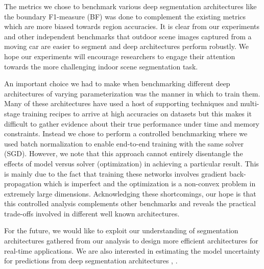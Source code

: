 \documentclass[10pt,journal,compsoc]{IEEEtran}
\begin{document}
 The metrics we chose to benchmark various deep segmentation architectures like the boundary F1-measure (BF) was done to complement the existing metrics which are more biased towards region accuracies. It is clear from our experiments and other independent benchmarks \cite{cordts2016cityscapes} that outdoor scene images captured from a moving car are easier to segment and deep architectures perform robustly. We hope our experiments will encourage researchers to engage their attention towards the more challenging indoor scene segmentation task.
 
An important choice we had to make when benchmarking different deep architectures of varying parameterization was the manner in which to train them. Many of these architectures have used a host of supporting techniques and multi-stage training recipes to arrive at high accuracies on datasets but this makes it difficult to gather evidence about their true performance under time and memory constraints. Instead we chose to perform a controlled benchmarking where we used batch normalization to enable end-to-end training with the same solver (SGD). However, we note that this approach cannot entirely disentangle the effects of model versus solver  (optimization) in achieving a particular result. This is mainly due to the fact that training these networks involves gradient back-propagation which is imperfect and the optimization is a non-convex problem in extremely large dimensions. Acknowledging these shortcomings, our hope is that this controlled analysis complements other benchmarks \cite{cordts2016cityscapes} and reveals the practical trade-offs involved in different well known architectures.

For the future, we would like to exploit our understanding of segmentation architectures gathered from our analysis to design more efficient architectures for real-time applications. We are also interested in estimating the model uncertainty for predictions from deep segmentation architectures \cite{gal2015dropout},  \cite{kendall2015bayesian}.
\end{document}
